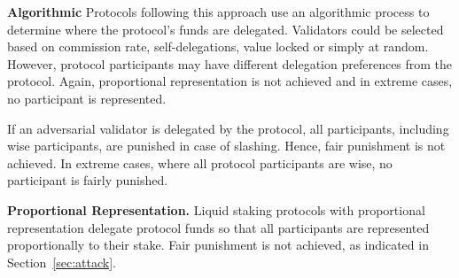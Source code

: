 

\textbf{Algorithmic}
Protocols following this approach use an algorithmic process to determine
where the protocol's funds are delegated. Validators could be selected based on
commission rate, self-delegations, value locked or simply at random.
However, protocol participants may have different delegation preferences from
the protocol. Again, proportional representation is not achieved and in
extreme cases, no participant is represented.

If an adversarial validator is delegated by the protocol, all participants,
including wise participants, are punished in case of slashing. Hence,
fair punishment is not achieved. In extreme cases, where all protocol
participants are wise, no participant is fairly punished.

\textbf{Proportional Representation.}
Liquid staking protocols with proportional representation delegate
protocol funds so that all participants are represented proportionally
to their stake. Fair punishment is not achieved, as indicated in
Section~\ref{sec:attack}.










